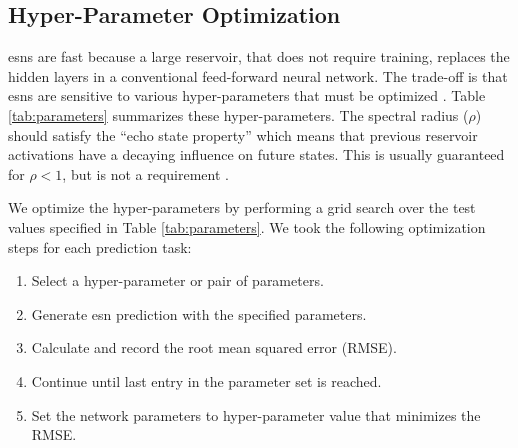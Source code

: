  \subsection{Hyper-Parameter Optimization}

 \glspl{esn} are fast because a large reservoir, that does not require
 training, replaces the hidden layers in a conventional feed-forward neural
 network.
 The trade-off is that \glspl{esn} are sensitive to various hyper-parameters
 that must be optimized \cite{lukosevicius_practical_2012}. Table \ref{tab:parameters} summarizes these hyper-parameters. The spectral radius ($\rho$) should satisfy the ``echo state property'' which means that
 previous reservoir activations have a decaying influence on future states. This
 is usually guaranteed for $\rho < 1$, but is not a requirement
 \cite{lukosevicius_practical_2012}.
 \begin{table}[ht]
   \centering
   \caption{Description of Model Hyper-Parameters}
   \label{tab:parameters}
 \end{table}
 We optimize the hyper-parameters by performing a grid search over the test
 values specified in Table \ref{tab:parameters}. We took the following
 optimization steps for each prediction task:
 \begin{enumerate}
   \item Select a hyper-parameter or pair of parameters.
   \item Generate \gls{esn} prediction with the specified parameters.
   \item Calculate and record the root mean squared error (RMSE).
   \item Continue until last entry in the parameter set is reached.
   \item Set the network parameters to hyper-parameter value that minimizes the
   RMSE.
 \end{enumerate}
